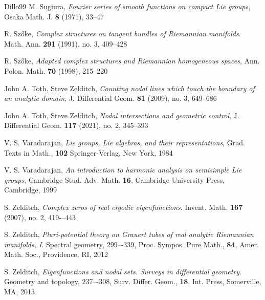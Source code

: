 \documentclass[12pt,a4paper]{article}
\theoremstyle{plain}
\theoremstyle{definition}
\begin{document}
\begin{thebibliography}{Dillo99}
M. Sugiura, 
{\em Fourier series of smooth functions on compact Lie groups},
Osaka Math. J. \textbf{8} (1971), 33–47


R. Sz\H{o}ke, {\em Complex structures on tangent bundles of Riemannian manifolds}. 
Math. Ann. \textbf{291} (1991), no. 3, 409–428

R. Sz\H{o}ke, 
{\em Adapted complex structures and Riemannian homogeneous spaces},
Ann. Polon. Math. \textbf{70} (1998), 215–220

%

John A. Toth, Steve Zelditch, 
{\em 
Counting nodal lines which touch the boundary of an analytic domain},
J. Differential Geom. \textbf{81} (2009), no. 3, 649–686

John A. Toth, Steve Zelditch, 
{\em 
Nodal intersections and geometric control},
J. Differential Geom. \textbf{117}
(2021), no. 2, 345–393


V. S. Varadarajan, 
{\em Lie groups, Lie algebras, and their representations},
Grad. Texts in Math., \textbf{102} 
Springer-Verlag, New York, 1984


V. S. Varadarajan, 
{\em An introduction to harmonic analysis on semisimple Lie groups},
Cambridge Stud. Adv. Math. \textbf{16}, 
Cambridge University Press, Cambridge, 1999




 S. Zelditch, {\em   Complex zeros of real ergodic eigenfunctions}. Invent. Math. \textbf{167} (2007), no. 2, 419-–443

 S. Zelditch, {\em Pluri-potential theory on Grauert tubes of real analytic Riemannian manifolds, I}. 
Spectral geometry, 299–-339, Proc. Sympos. Pure Math., \textbf{84}, 
Amer. Math. Soc., Providence, RI, 2012

 S. Zelditch, {\em  Eigenfunctions and nodal sets. Surveys in differential geometry}. Geometry and topology, 237–-308, Surv. Differ. Geom., \textbf{18}, Int. Press, Somerville, MA, 2013


\end{thebibliography}
\end{document}
